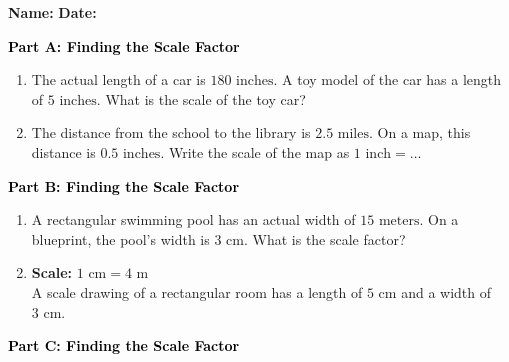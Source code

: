 \documentclass[12pt, letterpaper, fleqn]{article}
\begin{document}
\textbf{Name:} \underline{\hspace{5cm}}
\hfill
\textbf{Date:} \underline{\hspace{3cm}}\\

\begin{tcolorbox}[colback=customteal!20]
\large\textcolor{black}{\textbf{Part A: Finding the Scale Factor}}
\end{tcolorbox}

\vspace{3mm}

\begin{enumerate}[itemsep=2.5cm, leftmargin=0.6cm]
\item The actual length of a car is $180\text{ inches}$. A toy model of the car has a length of $5\text{ inches}$. What is the scale of the toy car?
\item The distance from the school to the library is $2.5\text{ miles}$. On a map, this distance is $0.5\text{ inches}$. Write the scale of the map as $1\text{ inch} = \dots$
\end{enumerate}

\newpage

\begin{tcolorbox}[colback=customteal!20]
\large\textcolor{black}{\textbf{Part B: Finding the Scale Factor}}
\end{tcolorbox}

\vspace{3mm}

\begin{enumerate}[itemsep=2.5cm, leftmargin=0.6cm, resume]
\item A rectangular swimming pool has an actual width of $15\text{ meters}$. On a blueprint, the pool's width is $3\text{ cm}$. What is the scale factor?
\item \textbf{Scale:} $1\text{ cm} = 4\text{ m}$ \\
A scale drawing of a rectangular room has a length of $5\text{ cm}$ and a width of $3\text{ cm}$.
\end{enumerate}

\newpage

\begin{tcolorbox}[colback=customteal!20]
\large\textcolor{black}{\textbf{Part C: Finding the Scale Factor}}
\end{tcolorbox}
\end{document}
